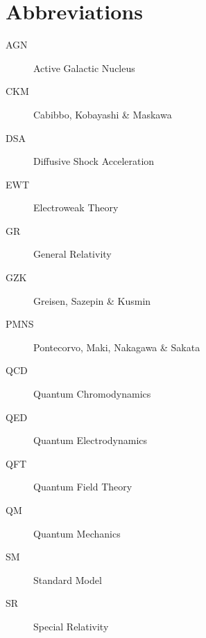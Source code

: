 \chapter*{Abbreviations}
\label{ch:abbreviations}

\begin{description}
	\item[AGN] Active Galactic Nucleus
	\item[CKM] Cabibbo, Kobayashi \& Maskawa
	\item[DSA] Diffusive Shock Acceleration
	\item[EWT] Electroweak Theory
	\item[GR] General Relativity
	\item[GZK] Greisen, Sazepin \& Kusmin
	\item[PMNS] Pontecorvo, Maki, Nakagawa \& Sakata
	\item[QCD] Quantum Chromodynamics
	\item[QED] Quantum Electrodynamics
	\item[QFT] Quantum Field Theory
	\item[QM] Quantum Mechanics
	\item[SM] Standard Model
	\item[SR] Special Relativity
\end{description}
